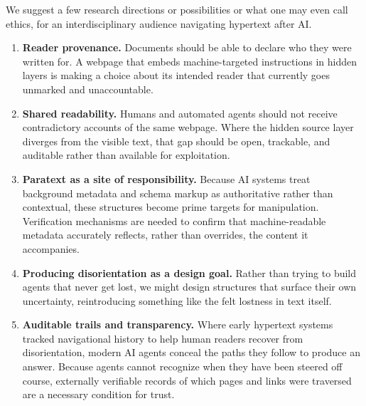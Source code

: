 \documentclass[sigconf,authordraft]{acmart}
\begin{document}
We suggest a few research directions or possibilities or what one may even call ethics, for an interdisciplinary audience navigating
hypertext after AI.

\begin{enumerate}
    \item \textbf{Reader provenance.} Documents should be able to declare who they were written for. A webpage that embeds machine-targeted instructions in hidden layers is making a choice about its intended reader that currently goes unmarked and unaccountable.
    
    \item \textbf{Shared readability.} Humans and automated agents should not receive contradictory accounts of the same webpage. Where the hidden source layer diverges from the visible text, that gap should be open, trackable, and auditable rather than available for exploitation.
    
    \item \textbf{Paratext as a site of responsibility.} Because AI systems treat background metadata and schema markup as authoritative rather than contextual, these structures become prime targets for manipulation. Verification mechanisms are needed to confirm that machine-readable metadata accurately reflects, rather than overrides, the content it accompanies.

    \item \textbf{Producing disorientation as a design goal.} Rather than trying to build agents that never get lost, we might design structures that surface their own uncertainty, reintroducing something like the felt lostness in text itself.
 
\item 
\textbf{Auditable trails and transparency.} Where early hypertext systems tracked navigational
history to help human readers recover from disorientation, modern AI agents
conceal the paths they follow to produce an answer. Because agents cannot
recognize when they have been steered off course, externally verifiable records
of which pages and links were traversed are a necessary condition for trust.
\end{enumerate}



\end{document}
